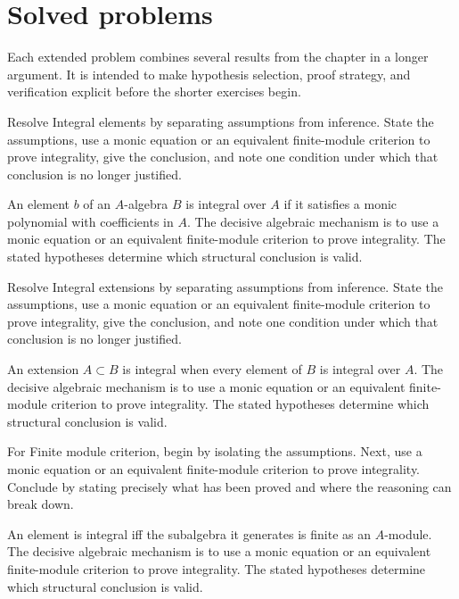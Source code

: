 \section{Solved problems}
Each extended problem combines several results from the chapter in a longer argument. It is intended to make hypothesis selection, proof strategy, and verification explicit before the shorter exercises begin.

\begin{problem}\label{prob:v19-problem-01}
Resolve Integral elements by separating assumptions from inference. State the assumptions, use a monic equation or an equivalent finite-module criterion to prove integrality, give the conclusion, and note one condition under which that conclusion is no longer justified.
\end{problem}
\begin{solution}
An element $b$ of an $A$-algebra $B$ is integral over $A$ if it satisfies a monic polynomial with coefficients in $A$. The decisive algebraic mechanism is to use a monic equation or an equivalent finite-module criterion to prove integrality. The stated hypotheses determine which structural conclusion is valid.
\end{solution}

\begin{problem}\label{prob:v19-problem-02}
Resolve Integral extensions by separating assumptions from inference. State the assumptions, use a monic equation or an equivalent finite-module criterion to prove integrality, give the conclusion, and note one condition under which that conclusion is no longer justified.
\end{problem}
\begin{solution}
An extension $A\subset B$ is integral when every element of $B$ is integral over $A$. The decisive algebraic mechanism is to use a monic equation or an equivalent finite-module criterion to prove integrality. The stated hypotheses determine which structural conclusion is valid.
\end{solution}

\begin{problem}\label{prob:v19-problem-03}
For Finite module criterion, begin by isolating the assumptions. Next, use a monic equation or an equivalent finite-module criterion to prove integrality. Conclude by stating precisely what has been proved and where the reasoning can break down.
\end{problem}
\begin{solution}
An element is integral iff the subalgebra it generates is finite as an $A$-module. The decisive algebraic mechanism is to use a monic equation or an equivalent finite-module criterion to prove integrality. The stated hypotheses determine which structural conclusion is valid.
\end{solution}

